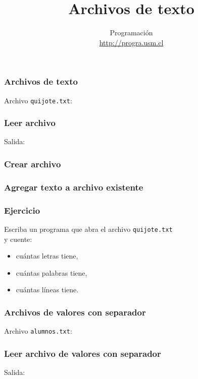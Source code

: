 \documentclass[12pt]{beamer}
\title{Archivos de texto}
\author{
  Programación \\ \url{http://progra.usm.cl}
}
\date{}
\begin{document}
  \begin{frame}
    \maketitle
  \end{frame}

  \begin{frame}
    \label{archivo-texto}
    \frametitle{Archivos de texto}
    Archivo \texttt{quijote.txt}:
    
  \end{frame}

  \begin{frame}
    \label{leer-archivo-texto}
    \frametitle{Leer archivo}
    
    \vfill
    Salida:
    
  \end{frame}

  \begin{frame}
    \label{crear-archivo-texto}
    \frametitle{Crear archivo}
    
  \end{frame}

  \begin{frame}
    \label{agregar-a-archivo-texto}
    \frametitle{Agregar texto a archivo existente}
    
  \end{frame}

  \begin{frame}
    \label{ejercicio-archivos-texto}
    \frametitle{Ejercicio}
    Escriba un programa que abra el archivo \texttt{quijote.txt} \\ y cuente:
    \begin{itemize}
      \item cuántas letras tiene,
      \item cuántas palabras tiene,
      \item cuántas líneas tiene.
    \end{itemize}
  \end{frame}

  \begin{frame}
    \label{archivo-csv}
    \frametitle{Archivos de valores con separador}
    Archivo \texttt{alumnos.txt}:
    
  \end{frame}

  \begin{frame}
    \label{leer-archivo-csv}
    \frametitle{Leer archivo de valores con separador}
    
    \vfill
    Salida:
    
  \end{frame}
\end{document}
